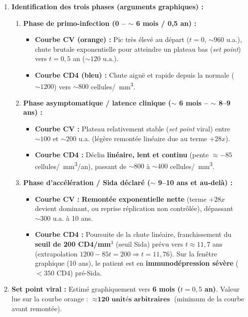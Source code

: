 \documentclass[11pt]{article}
\begin{document}
\begin{corrige}
\begin{enumerate}
\item \textbf{Identification des trois phases (arguments graphiques) :}
\begin{enumerate}
\item \textbf{Phase de primo-infection (0 -- $\sim$ 6 mois / 0,5 an) :}
\begin{itemize}
\item \textbf{Courbe CV (orange) :} Pic très élevé au départ ($t=0$, $\sim 960$ u.a.), chute brutale exponentielle pour atteindre un plateau bas (\emph{set point}) vers $t=0,5$ an ($\sim 120$ u.a.).
\item \textbf{Courbe CD4 (bleu) :} Chute aiguë et rapide depuis la normale ($\sim 1200$) vers $\sim 800$ cellules/\SI{}{mm^3}.
\end{itemize}
\item \textbf{Phase asymptomatique / latence clinique ($\sim$ 6 mois -- $\sim$ 8--9 ans) :}
\begin{itemize}
\item \textbf{Courbe CV :} Plateau relativement stable (\emph{set point} viral) entre $\sim 100$ et $\sim 200$ u.a. (légère remontée linéaire due au terme $+28x$).
\item \textbf{Courbe CD4 :} Déclin \textbf{linéaire, lent et continu} (pente $\approx -85$ cellules/\SI{}{mm^3}/an), passant de $\sim 800$ à $\sim 400$ cellules/\SI{}{mm^3}.
\end{itemize}
\item \textbf{Phase d'accélération / Sida déclaré ($\sim$ 9--10 ans et au-delà) :}
\begin{itemize}
\item \textbf{Courbe CV :} \textbf{Remontée exponentielle nette} (terme $+28x$ devient dominant, ou reprise réplication non contrôlée), dépassant $\sim 300$ u.a. à 10 ans.
\item \textbf{Courbe CD4 :} Poursuite de la chute linéaire, franchissement du \textbf{seuil de 200 CD4/mm$^3$} (seuil Sida) prévu vers $t \approx 11,7$ ans (extrapolation $1200 - 85t = 200 \Rightarrow t = 11,76$). Sur la fenêtre graphique (10 ans), le patient est en \textbf{immunodépression sévère} ($< 350$ CD4) pré-Sida.
\end{itemize}
\end{enumerate}
\item \textbf{Set point viral :} Estimé graphiquement vers \textbf{6 mois ($t=0,5$ an)}. Valeur lue sur la courbe orange : $\approx \textbf{120 unités arbitraires}$ (minimum de la courbe avant remontée).

\end{enumerate}
\end{corrige}
\end{document}

